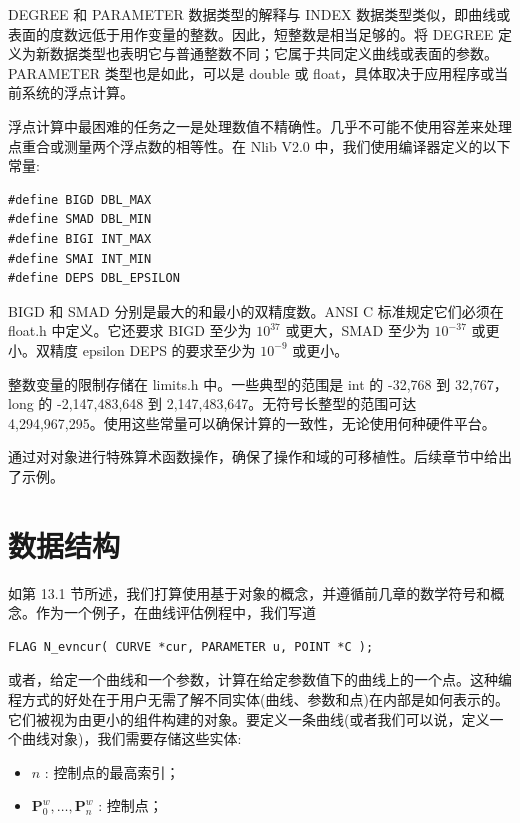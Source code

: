 \documentclass[../main.tex]{subfiles}
\begin{document}
DEGREE 和 PARAMETER 数据类型的解释与 INDEX 数据类型类似，即曲线或表面的度数远低于用作变量的整数。因此，短整数是相当足够的。将 DEGREE 定义为新数据类型也表明它与普通整数不同；它属于共同定义曲线或表面的参数。PARAMETER 类型也是如此，可以是 double 或 float，具体取决于应用程序或当前系统的浮点计算。

浮点计算中最困难的任务之一是处理数值不精确性。几乎不可能不使用容差来处理点重合或测量两个浮点数的相等性。在 Nlib V2.0 中，我们使用编译器定义的以下常量:

\begin{verbatim}
#define BIGD DBL_MAX
#define SMAD DBL_MIN
#define BIGI INT_MAX
#define SMAI INT_MIN
#define DEPS DBL_EPSILON
\end{verbatim}

BIGD 和 SMAD 分别是最大的和最小的双精度数。ANSI C 标准规定它们必须在 float.h 中定义。它还要求 BIGD 至少为 \({10}^{37}\) 或更大，SMAD 至少为 \({10}^{-{37}}\) 或更小。双精度 epsilon DEPS 的要求至少为 \({10}^{-9}\) 或更小。

整数变量的限制存储在 limits.h 中。一些典型的范围是 int 的 -32,768 到 32,767，long 的 -2,147,483,648 到 2,147,483,647。无符号长整型的范围可达 4,294,967,295。使用这些常量可以确保计算的一致性，无论使用何种硬件平台。

通过对对象进行特殊算术函数操作，确保了操作和域的可移植性。后续章节中给出了示例。


\section{数据结构}
如第 13.1 节所述，我们打算使用基于对象的概念，并遵循前几章的数学符号和概念。作为一个例子，在曲线评估例程中，我们写道

\begin{verbatim}
FLAG N_evncur( CURVE *cur, PARAMETER u, POINT *C );
\end{verbatim}

或者，给定一个曲线和一个参数，计算在给定参数值下的曲线上的一个点。这种编程方式的好处在于用户无需了解不同实体(曲线、参数和点)在内部是如何表示的。它们被视为由更小的组件构建的对象。要定义一条曲线(或者我们可以说，定义一个曲线对象)，我们需要存储这些实体:

\begin{itemize}
\item \(n\) : 控制点的最高索引；
\end{itemize}

\begin{itemize}
\item \({\mathbf{P}}_{0}^{w},\ldots ,{\mathbf{P}}_{n}^{w}\) : 控制点；
\end{itemize}
\end{document}
